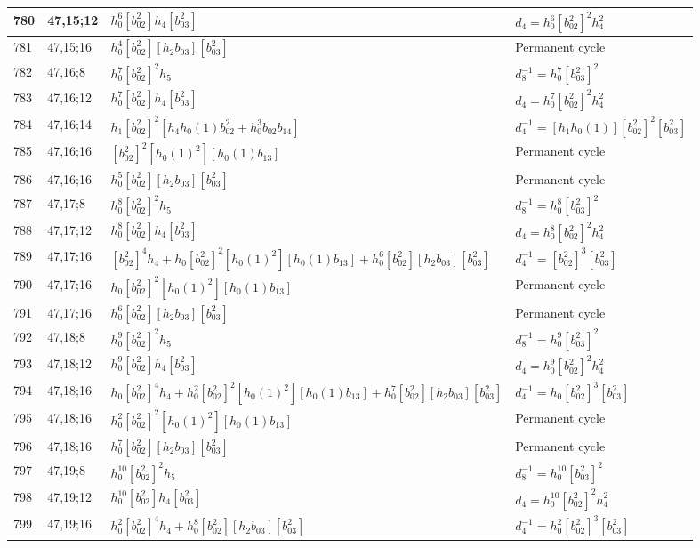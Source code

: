 \documentclass{article}
\begin{document}
\begin{longtable}{|l|l|>{\raggedright\arraybackslash}p{6cm}|>{\raggedright\arraybackslash}p{6cm}|}
\hline
780 & 47,15;12 & $h_0^6[b_{02}^2]h_4[b_{03}^2]$ &$d_{4}=h_0^6[b_{02}^2]^2h_4^2$\\
\hline
781 & 47,15;16 & $h_0^4[b_{02}^2][h_2b_{03}][b_{03}^2]$ & Permanent cycle\\
\hline
782 & 47,16;8 & $h_0^7[b_{02}^2]^2h_5$ & $d_{8}^{-1}=h_0^7[b_{03}^2]^2$\\
\hline
783 & 47,16;12 & $h_0^7[b_{02}^2]h_4[b_{03}^2]$ &$d_{4}=h_0^7[b_{02}^2]^2h_4^2$\\
\hline
784 & 47,16;14 & $h_1[b_{02}^2]^2[h_4h_0(1)b_{02}^2 + h_0^3b_{02}b_{14}]$ & $d_{4}^{-1}=[h_1h_0(1)][b_{02}^2]^2[b_{03}^2]$\\
\hline
785 & 47,16;16 & $[b_{02}^2]^2[h_0(1)^2][h_0(1)b_{13}]$ & Permanent cycle\\
786 & 47,16;16 & $h_0^5[b_{02}^2][h_2b_{03}][b_{03}^2]$ & Permanent cycle\\
\hline
787 & 47,17;8 & $h_0^8[b_{02}^2]^2h_5$ & $d_{8}^{-1}=h_0^8[b_{03}^2]^2$\\
\hline
788 & 47,17;12 & $h_0^8[b_{02}^2]h_4[b_{03}^2]$ &$d_{4}=h_0^8[b_{02}^2]^2h_4^2$\\
\hline
789 & 47,17;16 & $[b_{02}^2]^4h_4 + h_0[b_{02}^2]^2[h_0(1)^2][h_0(1)b_{13}] + h_0^6[b_{02}^2][h_2b_{03}][b_{03}^2]$ & $d_{4}^{-1}=[b_{02}^2]^3[b_{03}^2]$\\
790 & 47,17;16 & $h_0[b_{02}^2]^2[h_0(1)^2][h_0(1)b_{13}]$ & Permanent cycle\\
791 & 47,17;16 & $h_0^6[b_{02}^2][h_2b_{03}][b_{03}^2]$ & Permanent cycle\\
\hline
792 & 47,18;8 & $h_0^9[b_{02}^2]^2h_5$ & $d_{8}^{-1}=h_0^9[b_{03}^2]^2$\\
\hline
793 & 47,18;12 & $h_0^9[b_{02}^2]h_4[b_{03}^2]$ &$d_{4}=h_0^9[b_{02}^2]^2h_4^2$\\
\hline
794 & 47,18;16 & $h_0[b_{02}^2]^4h_4 + h_0^2[b_{02}^2]^2[h_0(1)^2][h_0(1)b_{13}] + h_0^7[b_{02}^2][h_2b_{03}][b_{03}^2]$ & $d_{4}^{-1}=h_0[b_{02}^2]^3[b_{03}^2]$\\
795 & 47,18;16 & $h_0^2[b_{02}^2]^2[h_0(1)^2][h_0(1)b_{13}]$ & Permanent cycle\\
796 & 47,18;16 & $h_0^7[b_{02}^2][h_2b_{03}][b_{03}^2]$ & Permanent cycle\\
\hline
797 & 47,19;8 & $h_0^{10}[b_{02}^2]^2h_5$ & $d_{8}^{-1}=h_0^{10}[b_{03}^2]^2$\\
\hline
798 & 47,19;12 & $h_0^{10}[b_{02}^2]h_4[b_{03}^2]$ &$d_{4}=h_0^{10}[b_{02}^2]^2h_4^2$\\
\hline
799 & 47,19;16 & $h_0^2[b_{02}^2]^4h_4 + h_0^8[b_{02}^2][h_2b_{03}][b_{03}^2]$ & $d_{4}^{-1}=h_0^2[b_{02}^2]^3[b_{03}^2]$\\

\end{longtable}
\end{document}
